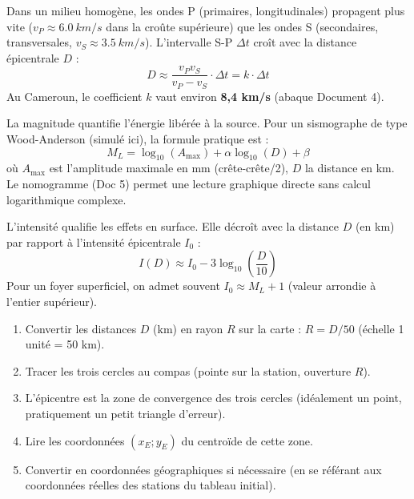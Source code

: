\documentclass[11pt]{article}
\newcounter{popsec}
\newcounter{popsub}
\newcommand{\courssub}[1]{%
  \stepcounter{popsub}%
  \par\vspace{9pt}\noindent{\popxbold\fontsize{11.5}{13}\selectfont\color{popink}{\color{poporange}\thepopsec.\thepopsub}\hspace{6pt}#1}\par\nopagebreak\vspace{4pt}
}
\begin{document}
\courssub{Ressources à mobiliser}
\begin{definition}
Dans un milieu homogène, les ondes P (primaires, longitudinales) propagent plus vite ($v_P \approx \SI{6,0}{km/s}$ dans la croûte supérieure) que les ondes S (secondaires, transversales, $v_S \approx \SI{3,5}{km/s}$). L'intervalle S-P $\Delta t$ croît avec la distance épicentrale $D$ :
\[ D \approx \frac{v_P v_S}{v_P - v_S} \cdot \Delta t = k \cdot \Delta t \]
Au Cameroun, le coefficient $k$ vaut environ \textbf{8,4 km/s} (abaque Document 4).
\end{definition}

\begin{definition}
La magnitude quantifie l'énergie libérée à la source. Pour un sismographe de type Wood-Anderson (simulé ici), la formule pratique est :
\[ M_L = \log_{10}(A_{\text{max}}) + \alpha \log_{10}(D) + \beta \]
où $A_{\text{max}}$ est l'amplitude maximale en mm (crête-crête/2), $D$ la distance en km. Le nomogramme (Doc 5) permet une lecture graphique directe sans calcul logarithmique complexe.
\end{definition}

\begin{definition}
L'intensité qualifie les effets en surface. Elle décroît avec la distance $D$ (en km) par rapport à l'intensité épicentrale $I_0$ :
\[ I(D) \approx I_0 - 3 \log_{10}\left(\frac{D}{10}\right) \]
Pour un foyer superficiel, on admet souvent $I_0 \approx M_L + 1$ (valeur arrondie à l'entier supérieur).
\end{definition}

\begin{methode}
\begin{enumerate}
    \item Convertir les distances $D$ (km) en rayon $R$ sur la carte : $R = D / 50$ (échelle 1 unité = 50 km).
    \item Tracer les trois cercles au compas (pointe sur la station, ouverture $R$).
    \item L'épicentre est la zone de convergence des trois cercles (idéalement un point, pratiquement un petit triangle d'erreur).
    \item Lire les coordonnées $(x_E ; y_E)$ du centroïde de cette zone.
    \item Convertir en coordonnées géographiques si nécessaire (en se référant aux coordonnées réelles des stations du tableau initial).
\end{enumerate}
\end{methode}
\end{document}
